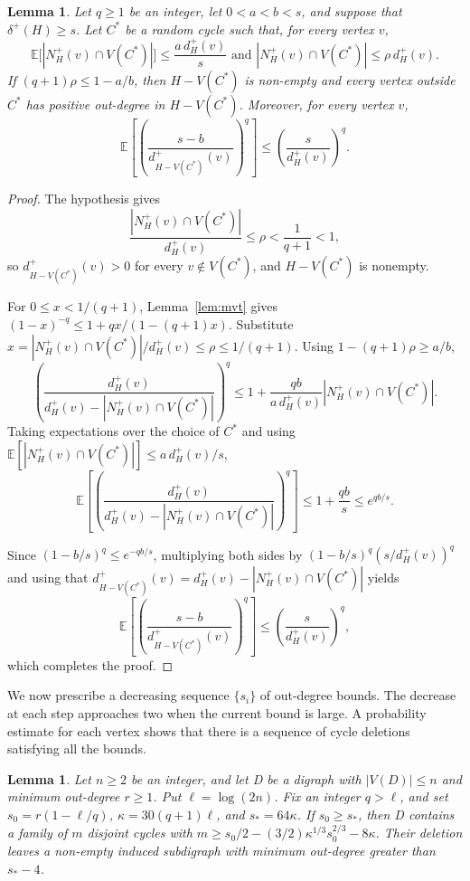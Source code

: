 \documentclass[10pt,a4paper]{article}
\newtheorem{lemma}[theorem]{Lemma}
\numberwithin{equation}{section}
\begin{document}
\begin{lemma}\label{lem:deletion}
Let $q\ge1$ be an integer, let $0<a<b<s$, and suppose that
$\delta^+(H)\ge s$. Let $C^\ast$ be a random cycle such that, for every
vertex $v$,
$$
\mathbb E\bigl[|N_H^+(v)\cap V(C^\ast)|\bigr]\le\frac{a\,d_H^+(v)}{s} \mbox{ and } 
|N_H^+(v)\cap V(C^\ast)|\le\rho\,d_H^+(v).
$$  If $(q+1)\rho\le1-a/b$, then $H-V(C^\ast)$ is non-empty and
every vertex outside $C^\ast$ has positive out-degree in
$H-V(C^\ast)$. Moreover, for every vertex $v$,
$$
\mathbb E\left[
\left(\frac{s-b}{d_{H-V(C^\ast)}^+(v)}\right)^q
\right]
\le\left(\frac{s}{d_H^+(v)}\right)^q.
$$
\end{lemma}


\begin{proof}
The hypothesis gives
$$
\frac{|N_H^+(v)\cap V(C^\ast)|}{d_H^+(v)}\le\rho<\frac1{q+1}<1,
$$
so $d_{H-V(C^\ast)}^+(v)>0$ for every $v\notin V(C^\ast)$, and
$H-V(C^\ast)$ is nonempty.

For $0\le x<1/(q+1)$, Lemma~\ref{lem:mvt} gives
$(1-x)^{-q}\le1+qx/(1-(q+1)x)$. Substitute $x=|N_H^+(v)\cap V(C^\ast)|/d_H^+(v)\le\rho\leq 1/(q+1)$. Using
$1-(q+1)\rho\ge a/b$,
$$
\left(\frac{d_H^+(v)}{d_H^+(v)-|N_H^+(v)\cap V(C^\ast)|}\right)^q
\le1+\frac{qb}{a\,d_H^+(v)}|N_H^+(v)\cap V(C^\ast)|.
$$
Taking expectations over the choice of $C^\ast$ and using
$\mathbb E[|N_H^+(v)\cap V(C^\ast)|]\le a\,d_H^+(v)/s$,
$$
\mathbb E\left[
\left(\frac{d_H^+(v)}{d_H^+(v)-|N_H^+(v)\cap V(C^\ast)|}\right)^q
\right]
\le1+\frac{qb}{s}\le e^{qb/s}.
$$

Since $(1-b/s)^q\le e^{-qb/s}$, multiplying both sides by
$(1-b/s)^q(s/d_H^+(v))^q$ and using that $d_{H-V(C^\ast)}^+(v)=d_H^+(v)-|N_H^+(v)\cap V(C^\ast)|$ yields  
$$
\mathbb E\left[
\left(\frac{s-b}{d_{H-V(C^\ast)}^+(v)}\right)^q
\right]
\le\left(\frac{s}{d_H^+(v)}\right)^q,
$$
which completes the proof.
\end{proof}





We now prescribe a decreasing sequence $\{s_i\}$ of out-degree bounds.
The decrease at each step approaches two when the current bound
is large. A probability estimate for each vertex shows that there
is a sequence of cycle deletions satisfying all the bounds.


\begin{lemma}\label{lem:sequence}
Let $n\ge2$ be an integer, and let D be a digraph with
$|V(D)|\le n$ and minimum out-degree $r\ge1$.
Put $\ell=\log(2n)$.
Fix an integer $q>\ell$, and set
$s_0=r(1-\ell/q)$, $\kappa=30(q+1)\ell$, and $s_\ast=64\kappa$.
If $s_0\ge s_\ast$, then D contains a family of $m$
disjoint cycles with
$m\ge s_0/2-(3/2)\kappa^{1/3}s_0^{2/3}-8\kappa$.
Their deletion leaves a non-empty induced subdigraph with minimum
out-degree greater than $s_\ast-4$.
\end{lemma}
\end{document}
